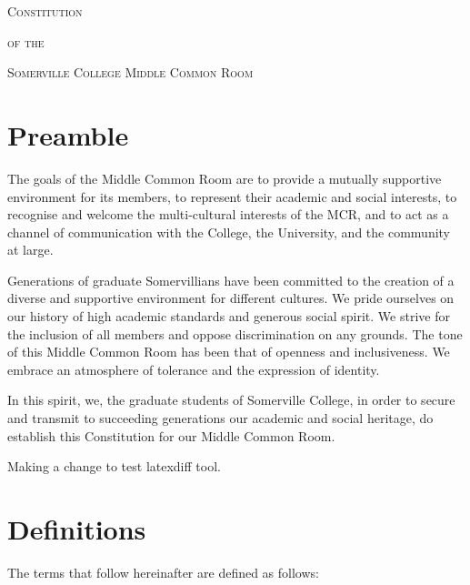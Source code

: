\documentclass[11pt, a4paper]{article}
\begin{document}

\centerline{{\Huge \textsc{Constitution}}}
\vspace{2mm}
\centerline{{\Large \textsc{of the}}}
\vspace{2mm}
\centerline{{\Large \textsc{Somerville College Middle Common Room}}}





\section{Preamble}
\label{sec:preamble}

The goals of the Middle Common Room are to provide a mutually supportive environment for its members, to represent their academic and social interests, to recognise and welcome the multi-cultural interests of the MCR, and to act as a channel of communication with the College, the University, and the community at large.

Generations of graduate Somervillians have been committed to the creation of a diverse and supportive environment for different cultures. We pride ourselves on our history of high academic standards and generous social spirit.  We strive for the inclusion of all members and oppose discrimination on any grounds. The tone of this Middle Common Room has been that of openness and inclusiveness. We embrace an atmosphere of tolerance and the expression of identity.

In this spirit, we, the graduate students of Somerville College, in order to secure and transmit to succeeding generations our academic and social heritage, do establish this Constitution for our Middle Common Room.

Making a change to test latexdiff tool.





\section{Definitions}
\label{sec:definitions}

The terms that follow hereinafter are defined as follows:
\end{document}
